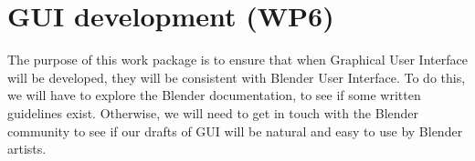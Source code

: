\section{GUI development (WP6)}

The purpose of this work package is to ensure that when Graphical User Interface will be developed, they will be consistent with Blender User Interface. To do this, we will have to explore the Blender documentation, to see if some written guidelines exist. Otherwise, we will need to get in touch with the Blender community to see if our drafts of GUI will be natural and easy to use by Blender artists.
